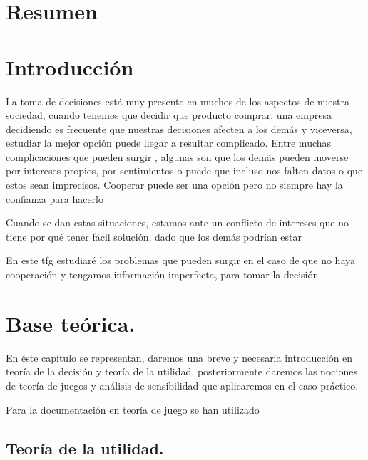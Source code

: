 \documentclass[a4paper]{report} %
\begin{document}
\tableofcontents

\listoffigures
\listoftables

\newpage

\chapter{Resumen}


\chapter{Introducción}

La toma de decisiones está muy presente en muchos de los aspectos de nuestra sociedad, cuando tenemos que decidir que producto comprar, una empresa decidiendo 
es frecuente que  nuestras decisiones afecten a los demás y viceversa, estudiar la mejor opción puede llegar a resultar complicado. Entre muchas complicaciones que pueden surgir , algunas son que los demás pueden moverse por intereses propios, por sentimientos o puede que incluso nos falten datos o que estos sean imprecisos. Cooperar puede ser una opción pero no siempre hay la confianza para hacerlo





Cuando se dan estas situaciones, estamos ante un conflicto de intereses que no tiene por qué tener fácil solución, dado que los demás podrían estar 








En este tfg estudiaré los problemas que pueden surgir en el caso de que no haya cooperación y tengamos información imperfecta, para tomar la decisión 

\chapter{Base teórica.}


En éste capítulo se representan, daremos una breve y necesaria introducción en teoría de la decisión y teoría de la utilidad, posteriormente daremos las nociones de teoría de juegos y análisis de sensibilidad que aplicaremos en el caso práctico.

Para la documentación en teoría de juego se han utilizado




\section{Teoría de la utilidad.}
\end{document}
